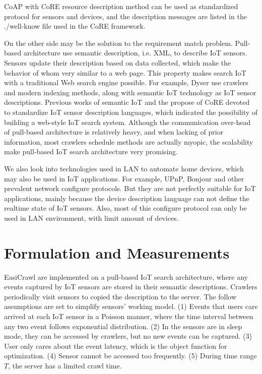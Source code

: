 \documentclass[conference]{IEEEtran}
\begin{document}
CoAP with CoRE resource description method can be used as standardized protocol for sensors and devices, and the description messages are listed in the ./well-know file used in the CoRE framework. 

On the other side may be the solution to the requirement match problem.
Pull-based architecture use semantic description, i.e. XML, to describe IoT sensors. Sensors update their description based on data collected, which make the behavior of whom very similar to a web page. This property makes search IoT with a traditional Web search engine possible. For example, Dyser\cite{Dyser} use crawlers and modern indexing methods, along with semantic IoT technology as IoT sensor descriptions. Previous works of semantic IoT\cite{Compton2012} and the propose of CoRE\cite{CoREWorkingGroup2012} devoted to standardize IoT sensor description languages, which indicated the possibility of building a web-style IoT search system. Although the communication over-head of pull-based architecture is relatively heavy, and when lacking of prior information, most crawlers schedule methods are actually myopic, the scalability make pull-based IoT search architecture very promising.


We also look into technologies used in LAN to automate home devices, which may also be used in IoT applications. For example, UPnP\cite{UPnP}, Bonjour\cite{Bonjour} and other prevalent network configure protocols. But they are not perfectly suitable for IoT applications, mainly because the device description language can not define the realtime state of IoT sensors. Also, most of this configure protocol can only be used in LAN environment, with limit amount of devices.

\section{Formulation and Measurements}\label{formulation}
EasiCrawl are implemented on a pull-based IoT search architecture, where any events captured by IoT sensors are stored in their semantic descriptions. Crawlers periodically visit sensors to copied the description to the server.
The follow assumptions are set to simplify sensors' working model. 
(1) Events that users care arrived at each IoT sensor in a Poisson manner, where the time interval between any two event follows exponential distribution. 
(2) In the sensors are in sleep mode, they can be accessed by crawlers, but no new events can be captured.
(3) User only cares about the event latency, which is the object function for optimization.
(4) Sensor cannot be accessed too frequently.
(5) During time range $T$, the server has a limited crawl time.
\end{document}
